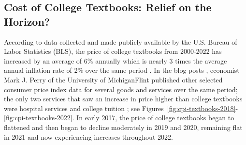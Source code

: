 \documentclass[11pt]{article}
\begin{document}
\subsection{Cost of College Textbooks: Relief on the Horizon?}
According to data collected and made publicly available by the U.S. Bureau of Labor Statistics (BLS), the price of college textbooks from 2000-2022 has increased by an average of 6\% annually which is nearly 3 times the average annual inflation rate of 2\% over the same period \cite{bls}. In the blog posts \cite{perry2018, perry2022}, economist Mark J. Perry of the University of Michigan\textendash Flint published other selected consumer price index data for several goods and services over the same period; the only two services that saw an increase in price higher than college textbooks were hospital services and college tuition \cite{perry2018, perry2022}; see Figures~\ref{fig:cpi-textbooks-2018}-\ref{fig:cpi-textbooks-2022}. In early 2017, the price of college textbooks began to flattened and then began to decline moderately in 2019 and 2020, remaining flat in 2021 and now experiencing increases throughout 2022.
\end{document}
